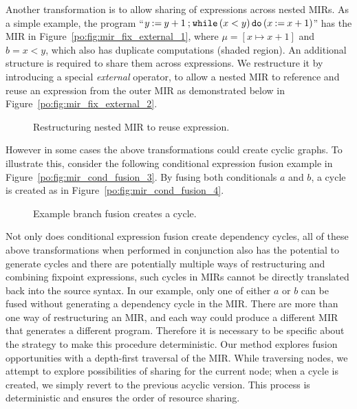 Another transformation is to allow sharing of expressions across nested
MIRs.  As a simple example, the program ``$y\mathbin{:=}{y + 1}
\mathbin{;} \texttt{while} \left(x < y\right) \texttt{do} \left(x\mathbin{:=}{x + 1}\right)$'' has the MIR in
Figure~\ref{po:fig:mir_fix_external_1}, where $\mu = [x \mapsto x + 1]$ and $b
= x < y$, which also has duplicate computations (shaded region).  An additional
structure is required to share them across expressions.  We restructure it
by introducing a special \emph{external} operator, to allow a nested MIR to
reference and reuse an expression from the outer MIR as demonstrated below in
Figure~\ref{po:fig:mir_fix_external_2}.
\begin{figure}[ht]
    \centering
    \caption{Restructuring nested MIR to reuse expression.}
    \centering
\end{figure}

However in some cases the above transformations could create cyclic graphs.  To
illustrate this, consider the following conditional expression fusion example
in Figure~\ref{po:fig:mir_cond_fusion_3}.  By fusing both conditionals $a$ and
$b$, a cycle is created as in Figure~\ref{po:fig:mir_cond_fusion_4}.
\begin{figure}[ht]
    \centering
    \quad
    \caption{Example branch fusion creates a cycle.}
\end{figure}

Not only does conditional expression fusion create dependency cycles, all
of these above transformations when performed in conjunction also has the
potential to generate cycles and there are potentially multiple ways of
restructuring and combining fixpoint expressions, such cycles in MIRs cannot
be directly translated back into the source syntax.  In our example, only
one of either $a$ or $b$ can be fused without generating a dependency cycle
in the MIR\@.  There are more than one way of restructuring an MIR, and
each way could produce a different MIR that generates a different program.
Therefore it is necessary to be specific about the strategy to make this
procedure deterministic.  Our method explores fusion opportunities with a
depth-first traversal of the MIR\@.  While traversing nodes, we attempt
to explore possibilities of sharing for the current node; when a cycle is
created, we simply revert to the previous acyclic version.  This process is
deterministic and ensures the order of resource sharing.

